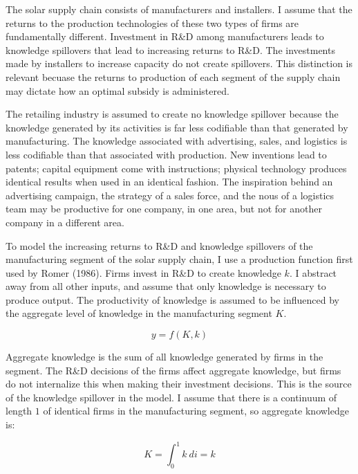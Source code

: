 \documentclass{article}
\begin{document}
The solar supply chain consists of manufacturers and installers. I assume that the returns to the production technologies of these two types of firms are fundamentally different. Investment in R\&D among manufacturers leads to knowledge spillovers that lead to increasing returns to R\&D. The investments made by installers to increase capacity do not create spillovers. This distinction is relevant becuase the returns to production of each segment of the supply chain may dictate how an optimal subsidy is administered.

The retailing industry is assumed to create no knowledge spillover because the knowledge generated by its activities is far less codifiable than that generated by manufacturing. The knowledge associated with advertising, sales, and logistics is less codifiable than that associated with production. New inventions lead to patents; capital equipment come with instructions; physical technology produces identical results when used in an identical fashion. The inspiration behind an advertising campaign, the strategy of a sales force, and the nous of a logistics team may be productive for one company, in one area, but not for another company in a different area.

To model the increasing returns to R\&D and knowledge spillovers of the manufacturing segment of the solar supply chain, I use a production function first used by Romer (1986). Firms invest in R\&D to create knowledge $k$. I abstract away from all other inputs, and assume that only knowledge is necessary to produce output. The productivity of knowledge is assumed to be influenced by the aggregate level of knowledge in the manufacturing segment $K$. 

\begin{equation}
y = f(K,k)
\end{equation}

Aggregate knowledge is the sum of all knowledge generated by firms in the segment. The R\&D decisions of the firms affect aggregate knowledge, but firms do not internalize this when making their investment decisions. This is the source of the knowledge spillover in the model. I assume that there is a continuum of length $1$ of identical firms in the manufacturing segment, so aggregate knowledge is:


\begin{equation}
K = \int_0^1 k ~ di = k
\end{equation}
\end{document}
